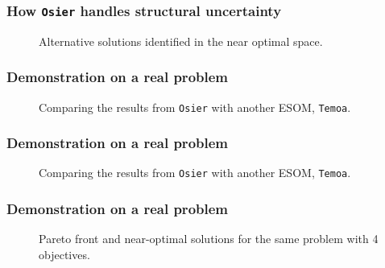 \begin{frame}
    \frametitle{How \texttt{Osier} handles structural uncertainty}


        \begin{figure}
            \centering
            \resizebox{0.8\columnwidth}{!}{}
            \caption{Alternative solutions identified in the near optimal space.}
            \label{fig:nd-alt-points}
        \end{figure}

\end{frame}

\begin{frame}
    \frametitle{Demonstration on a real problem}

    \begin{figure}
        \centering 
        \resizebox{0.75\columnwidth}{!}{}
        \caption{Comparing the results from \texttt{Osier} with another ESOM, \texttt{Temoa}.}
        \label{fig:osier-temoa-benchmark-1}
    \end{figure}

\end{frame}


\begin{frame}
    \frametitle{Demonstration on a real problem}

    \begin{figure}
        \centering 
        \resizebox{0.75\columnwidth}{!}{}
        \caption{Comparing the results from \texttt{Osier} with another ESOM, \texttt{Temoa}.}
        \label{fig:osier-temoa-benchmark-2}
    \end{figure}

\end{frame}

\begin{frame}
    \frametitle{Demonstration on a real problem}

    \begin{figure}
        \centering 
        \resizebox{0.9\columnwidth}{!}{}
        \caption{Pareto front and near-optimal solutions for the same problem with 4 objectives.}
        \label{fig:4-obj-objective-space}
    \end{figure}

\end{frame}

